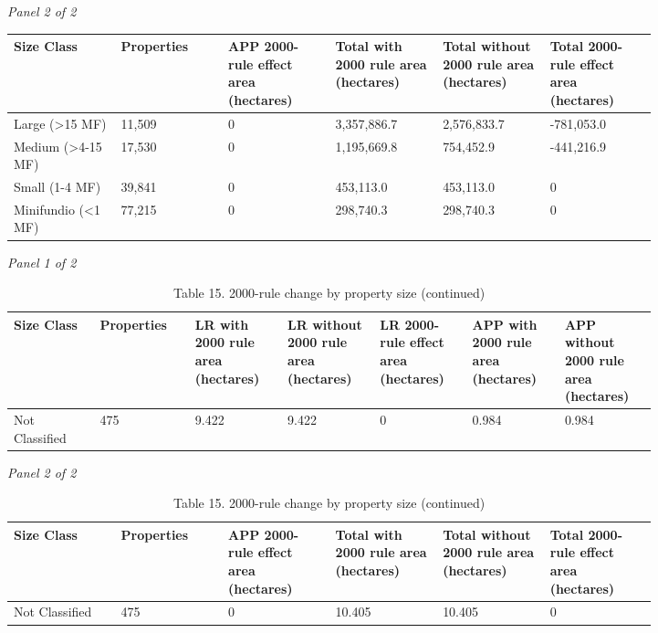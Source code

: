 \documentclass[12pt]{article}
\begin{document}
\begin{landscape}
\begin{table}[H]
\textit{Panel 2 of 2}\\[2pt]
{\fontsize{12}{14}\selectfont
\setlength{\tabcolsep}{3pt}
\renewcommand{\arraystretch}{1.08}
\begin{tabular}{p{0.137\linewidth}p{0.137\linewidth}p{0.137\linewidth}p{0.137\linewidth}p{0.137\linewidth}p{0.137\linewidth}}
\toprule
Size Class & Properties & APP 2000-rule effect area (hectares) & Total with 2000 rule area (hectares) & Total without 2000 rule area (hectares) & Total 2000-rule effect area (hectares) \\
\midrule
Large (>15 MF) & 11,509 & 0 & 3,357,886.7 & 2,576,833.7 & -781,053.0 \\
Medium (>4-15 MF) & 17,530 & 0 & 1,195,669.8 & 754,452.9 & -441,216.9 \\
Small (1-4 MF) & 39,841 & 0 & 453,113.0 & 453,113.0 & 0 \\
Minifundio (<1 MF) & 77,215 & 0 & 298,740.3 & 298,740.3 & 0 \\
\bottomrule
\end{tabular}
}
\end{table}
\begin{table}[H]
\centering
\caption{Table 15. 2000-rule change by property size (continued)}
\textit{Panel 1 of 2}\\[2pt]
{\fontsize{12}{14}\selectfont
\setlength{\tabcolsep}{3pt}
\renewcommand{\arraystretch}{1.08}
\begin{tabular}{p{0.117\linewidth}p{0.117\linewidth}p{0.117\linewidth}p{0.117\linewidth}p{0.117\linewidth}p{0.117\linewidth}p{0.117\linewidth}}
\toprule
Size Class & Properties & LR with 2000 rule area (hectares) & LR without 2000 rule area (hectares) & LR 2000-rule effect area (hectares) & APP with 2000 rule area (hectares) & APP without 2000 rule area (hectares) \\
\midrule
Not Classified & 475 & 9.422 & 9.422 & 0 & 0.984 & 0.984 \\
\bottomrule
\end{tabular}
}

\vspace{0.6em}

\textit{Panel 2 of 2}\\[2pt]
{\fontsize{12}{14}\selectfont
\setlength{\tabcolsep}{3pt}
\renewcommand{\arraystretch}{1.08}
\begin{tabular}{p{0.137\linewidth}p{0.137\linewidth}p{0.137\linewidth}p{0.137\linewidth}p{0.137\linewidth}p{0.137\linewidth}}
\toprule
Size Class & Properties & APP 2000-rule effect area (hectares) & Total with 2000 rule area (hectares) & Total without 2000 rule area (hectares) & Total 2000-rule effect area (hectares) \\
\midrule
Not Classified & 475 & 0 & 10.405 & 10.405 & 0 \\
\bottomrule
\end{tabular}
}
\end{table}
\end{landscape}
\end{document}
